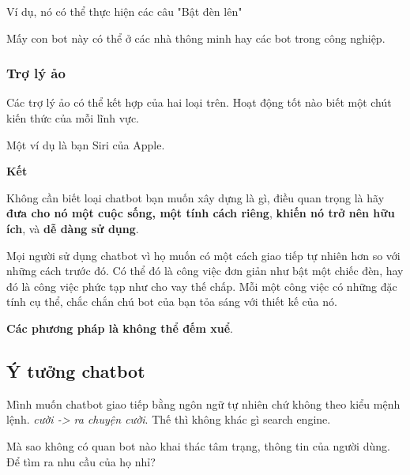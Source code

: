 Ví dụ, nó có thể thực hiện các câu "Bật đèn lên"

Mấy con bot này có thể ở các nhà thông minh hay các bot trong công nghiệp.

\subsubsection{Trợ lý ảo}

Các trợ lý ảo có thể kết hợp của hai loại trên. Hoạt động tốt nào biết một chút kiến thức của mỗi lĩnh vực.

Một ví dụ là bạn Siri của Apple.

\textbf{Kết}

Không cần biết loại chatbot bạn muốn xây dựng là gì, điều quan trọng là hãy \textbf{đưa cho nó một cuộc sống, một tính cách riêng}, \textbf{khiến nó trở nên hữu ích}, và \textbf{dễ dàng sử dụng}.

Mọi người sử dụng chatbot vì họ muốn có một cách giao tiếp tự nhiên hơn so với những cách trước đó. Có thể đó là công việc đơn giản như bật một chiếc đèn, hay đó là công việc phức tạp như cho vay thế chấp. Mỗi một công việc có những đặc tính cụ thể, chắc chắn chú bot của bạn tỏa sáng với thiết kế của nó.

\textbf{Các phương pháp là không thể đếm xuể}.

\subsection{Ý tưởng chatbot}


Mình muốn chatbot giao tiếp bằng ngôn ngữ tự nhiên chứ không theo kiểu mệnh lệnh. \textit{cười -> ra chuyện cười}. Thế thì không khác gì search engine.

Mà sao không có quan bot nào khai thác tâm trạng, thông tin của người dùng. Để tìm ra nhu cầu của họ nhỉ?

